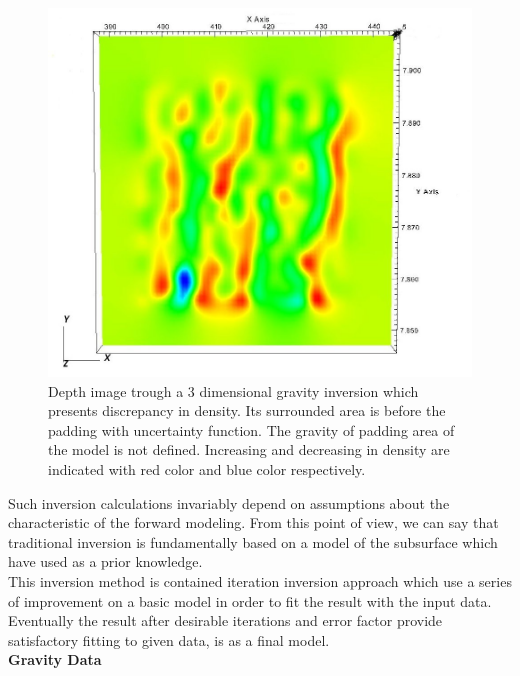 \begin{figure}
\centering
\includegraphics[width=\textwidth]{pasted1.png}
\caption{Depth image trough a 3 dimensional gravity inversion which presents discrepancy in density. Its surrounded area is before the padding with uncertainty function. The gravity of padding area of the
model is not defined. Increasing and decreasing in density are indicated
with red color and blue color respectively.}
\end{figure}

Such inversion calculations invariably depend on assumptions about the characteristic of the forward modeling. From this point of view, we can say that traditional inversion is fundamentally based on a model of the subsurface which have used as a prior knowledge.\\
This inversion method is contained iteration inversion approach which use a series of improvement on a basic model in order to fit the result with the input data. Eventually the result after desirable iterations and error factor provide  satisfactory fitting to given data, is as a final model.\\


\textbf{Gravity Data} \\

